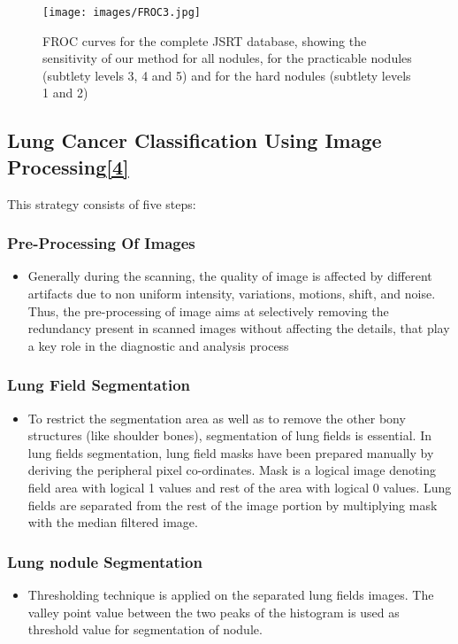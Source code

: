 \documentclass[hidelinks,12pt]{article}
\begin{document}
\begin{figure}[h]
      \texttt{[image: images/FROC3.jpg]}
      \centering
      \label{fig:3}
      \caption{FROC curves for the complete JSRT database, showing the sensitivity of our method for all nodules, for the practicable nodules (subtlety levels 3, 4 and 5) and for the hard nodules (subtlety levels 1 and 2)}
\end{figure}  
    
\newpage
    
\subsection{Lung Cancer Classification Using Image Processing\hyperref[4]{[4]}}
This strategy consists of five steps:

\subsubsection{Pre-Processing Of Images} 
\begin{itemize}
\item Generally during the
scanning, the quality of image is affected by different
artifacts due to non uniform intensity, variations, motions,
shift, and noise. Thus, the pre-processing of image aims at
selectively removing the redundancy present in scanned
images without affecting the details, that play a key role in
the diagnostic and analysis process
\end{itemize}
\subsubsection{Lung Field Segmentation}
\begin{itemize}
\item To restrict the segmentation area
as well as to remove the other bony structures (like shoulder
bones), segmentation of lung fields is essential. In lung
fields segmentation, lung field masks have been prepared
manually by deriving the peripheral pixel co-ordinates.
Mask is a logical image denoting field area with logical 1
values and rest of the area with logical 0 values.
Lung fields are separated from the rest of the image portion
by multiplying mask with the median filtered image.
\end{itemize}
\subsubsection{Lung nodule Segmentation}
\begin{itemize}
\item Thresholding technique is applied on the separated lung
fields images. The valley point value between the two
peaks of the histogram is used as threshold value for
segmentation of nodule.
\end{itemize}
\end{document}
